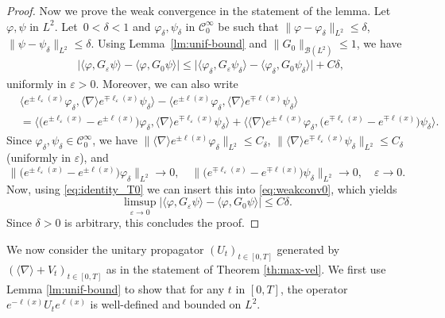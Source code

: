 \documentclass[12pt]{article}
\newcommand{\jnabla}{{\langle\nabla\rangle}}
\newcommand{\Teps}{{G_\varepsilon}}
\newcommand{\Tzero}{{G_0}}
\theoremstyle{plain}
\begin{document}
\begin{proof}
Now we prove the weak convergence in the statement of the lemma. Let $\varphi,\psi$ in $ L^2$. Let~$0<\delta<1$ and $\varphi_\delta,\psi_\delta$ in $\mathcal{C}_0^\infty$ be such that $\|\varphi-\varphi_\delta\|_{L^2}\le\delta$, $\|\psi-\psi_\delta\|_{L^2}\le\delta$. Using Lemma~\ref{lm:unif-bound} and $\|\Tzero\|_{\mathcal{B}(L^2)}\le1$, we have
\begin{align}
   &\big|\langle\varphi,\Teps\psi\rangle-\langle\varphi,\Tzero\psi\rangle\big|\le\big|\langle\varphi_\delta,\Teps\psi_\delta\rangle-\langle\varphi_\delta,\Tzero\psi_\delta\rangle\big|+C\delta,\label{eq:weakconv0}
\end{align}
uniformly in $\varepsilon>0$. Moreover, we can also write
\begin{align*}
    &\langle e^{\pm\ell_\varepsilon(x)}\varphi_\delta, \langle\nabla\rangle e^{\mp\ell_\varepsilon(x)}\psi_\delta\rangle-\langle e^{\pm\ell(x)}\varphi_\delta, \langle\nabla\rangle e^{\mp\ell(x)}\psi_\delta\rangle\\
    &=\big\langle\big(e^{\pm\ell_\varepsilon(x)}-e^{\pm\ell(x)}\big)\varphi_\delta, \langle\nabla\rangle e^{\mp\ell_\varepsilon(x)}\psi_\delta\big\rangle+\big\langle \langle\nabla\rangle e^{\pm\ell(x)}\varphi_\delta,  \big( e^{\mp\ell_\varepsilon(x)}-e^{\mp\ell(x)}\big)\psi_\delta\big\rangle.
\end{align*}
Since $\varphi_\delta,\psi_\delta\in\mathcal{C}_0^\infty$, we have $\|\langle\nabla\rangle e^{\pm\ell(x)}\varphi_\delta\|_{L^2}\le C_\delta$, $\|\langle\nabla\rangle e^{\mp\ell_\varepsilon(x)}\psi_\delta\|_{L^2}\le C_\delta$ (uniformly in $\varepsilon$), and
\begin{equation*}
    \big\|\big(e^{\pm\ell_\varepsilon(x)}-e^{\pm\ell(x)}\big)\varphi_\delta\big\|_{L^2}\to0, \quad \big\|\big(e^{\mp\ell_\varepsilon(x)}-e^{\mp\ell(x)}\big)\psi_\delta\big\|_{L^2}\to0, \quad\varepsilon\to0.
\end{equation*}
Now, using \eqref{eq:identity_T0} we can insert this into \eqref{eq:weakconv0}, which yields
\begin{equation*}
    \limsup_{\varepsilon\to0}\big|\langle\varphi,\Teps\psi\rangle-\langle\varphi,\Tzero\psi\rangle\big|\le C\delta.
\end{equation*}
Since $\delta>0$ is arbitrary, this concludes the proof.
\end{proof}

	We now consider the unitary propagator $(U_t)_{t\in[0,T]}$ generated by $(\jnabla+V_t)_{t\in[0,T]}$ as in the statement of Theorem \ref{th:max-vel}. We first use Lemma \ref{lm:unif-bound} to show that for any $t$ in $[0,T]$, the operator $e^{-\ell(x)}U_te^{\ell(x)}$ is well-defined and bounded on $L^2$.
	
\end{document}
